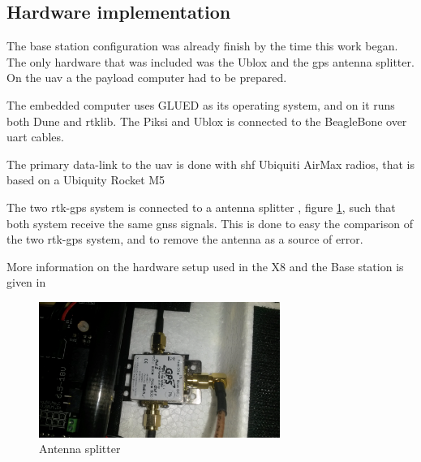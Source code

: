 \subsection{Hardware implementation}
The base station configuration was already finish by the time this work began. The only hardware that was included was the Ublox and the \gls{gps} antenna splitter. On the \gls{uav} a the payload computer had to be prepared.

The embedded computer uses GLUED as its operating system, and on it runs both Dune and rtklib. The Piksi and Ublox is connected to the BeagleBone over uart cables.

The primary data-link to the \gls{uav} is done with {shf} Ubiquiti AirMax radios, that is based on a Ubiquity Rocket M5

The two \gls{rtk-gps} system is connected to a antenna splitter , figure \ref{figure:AntennaSplitter}, such that both system receive the same \gls{gnss} signals. This is done to easy the comparison of the two \gls{rtk-gps} system, and to remove the antenna as a source of error.

More information on the hardware setup used in the X8 and the Base station is given in \citep{KlausenX8}
\begin{figure}[H]
	\centering
		\includegraphics[width=0.7\textwidth]{figs/066.jpg}
		\caption{Antenna splitter}
		\label{figure:AntennaSplitter}
\end{figure}
\cleardoublepage